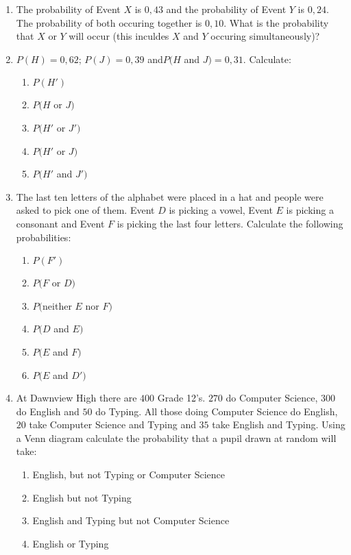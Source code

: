 \begin{enumerate}
\item The probability of Event $X$ is $0,43$ and the probability of Event $Y$ is $0,24$. The probability of both occuring together is $0,10$. What is the probability that $X$ or $Y$ will occur (this inculdes $X$ and $Y$ occuring simultaneously)?  
\item$ P(H)=0,62$; $P(J)=0,39$ and$ P(H$ and $J)=0,31$. Calculate:
	\begin{enumerate}
	\item $P(H')$ 
	\item $P(H$ or $J)$
	\item $P(H'$ or $J')$
	\item $P(H'$ or $J)$
	\item $P(H'$ and $J')$
	\end{enumerate}
\item The last ten letters of the alphabet were placed in a hat and people were asked to pick one of them. Event $D$ is picking a vowel, Event $E$ is picking a consonant and Event $F$ is picking the last four letters. Calculate the following probabilities:
	\begin{enumerate}
	\item $P(F')$ 
	\item $P(F$ or $D)$
	\item $P($neither $E$ nor $F)$
	\item $P(D$ and $E)$
	\item $P(E$ and $F)$
	\item $P(E$ and $D')$
	\end{enumerate}
\item At Dawnview High there are $400$ Grade 12's. $270$ do Computer Science, $300$ do English and $50$ do Typing. All those doing Computer Science do English, $20$ take Computer Science and Typing and $35$ take English and Typing. Using a Venn diagram calculate the probability that a pupil drawn at random will take:
	\begin{enumerate}
	\item English, but not Typing or Computer Science 
	\item English but not Typing
	\item English and Typing but not Computer Science
	\item English or Typing
	\end{enumerate}   
\end{enumerate}










\appendix

